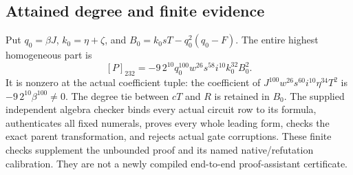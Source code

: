 \subsection{Attained degree and finite evidence}
Put $q_0=\beta J$, $k_0=\eta+\zeta$, and
$B_0=k_0sT-q_0^2(q_0-F)$. The entire highest homogeneous part is
\[
 [P]_{232}=-9\,2^{10}q_0^{100}w^{26}s^{58}i^{10}k_0^{32}B_0^2.
\]
It is nonzero at the actual coefficient tuple: the coefficient of
$J^{100}w^{26}s^{60}i^{10}\eta^{34}T^2$ is
$-9\,2^{10}\beta^{100}\ne0$. The degree tie between $cT$ and $R$ is
retained in $B_0$.
The supplied independent algebra checker binds every actual circuit row to
its formula, authenticates all fixed numerals, proves every whole leading
form, checks the exact parent transformation, and rejects actual gate
corruptions. These finite checks supplement the unbounded proof and its
named native/refutation calibration. They are not a newly compiled
end-to-end proof-assistant certificate.
